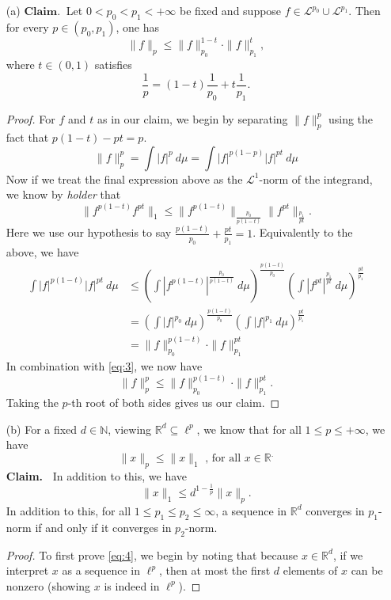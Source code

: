 \documentclass[12pt]{article}
\newcommand{\R}{\mathbb{R}}
\newcommand{\N}{\mathbb{N}}
\newcommand{\eq}[1]{\begin{equation*}#1\end{equation*}}
\newcommand{\al}[1]{\begin{align*}#1\end{align*}}
\newcommand{\qeq}[1]{\begin{equation}#1\end{equation}}
\begin{document}
\begin{itemize}
    \item [(a)] $\mathbf{Claim.}~$ Let $0 < p_0 < p_1 < +\infty$ be fixed and suppose $f \in \mathcal{L}^{p_0} \cup \mathcal{L}^{p_1}$. Then for every $p \in (p_0, p_1)$, one has
    \eq{\|f\|_p \leq \|f\|_{p_0}^{1-t} \cdot \|f\|_{p_1}^t,}
    where $t \in (0, 1)$ satisfies
    \eq{\frac{1}{p} = (1-t) \frac{1}{p_0} + t \frac{1}{p_1}.}
    
    \begin{proof}
        For $f$ and $t$ as in our claim, we begin by separating $\|f\|_p^p$ using the fact that $p(1-t) - pt = p$.
        \qeq{\|f\|_p^p = \int |f|^p ~d \mu = \int |f|^{p(1-p)} |f|^{pt} ~d\mu \label{eq:3}}
        Now if we treat the final expression above as the $\mathcal{L}^1$-norm of the integrand, we know by \textit{holder} that
        \eq{\|f^{p(1-t)}f^{pt}\|_1 \leq \|f^{p(1-t)}\|_\frac{p_0}{p(1-t)} \|f^{pt}\|_\frac{p_1}{pt}.}
        Here we use our hypothesis to say $\frac{p(1-t)}{p_0} + \frac{pt}{p_1} = 1$. Equivalently to the above, we have
        \al{\int |f|^{p(1-t)} |f|^{pt} ~d \mu &\leq \left( \int \left| f^{p(1-t)}\right|^\frac{p_0}{p(1-t)} ~d \mu\right)^\frac{p(1-t)}{p_0} \left( \int \left| f^{pt}\right|^\frac{p_1}{pt} ~d \mu \right)^\frac{pt}{p_1} \\
        &= \left( \int |f|^{p_0} ~d \mu\right)^\frac{p(1-t)}{p_0} \left( \int |f|^{p_1} ~d \mu\right)^\frac{pt}{p_1} \\
        &= \|f\|_{p_0}^{p(1-t)} \cdot \|f\|_{p_1}^{pt}}
        In combination with \eqref{eq:3}, we now have
        \eq{\|f\|_p^p \leq \|f\|_{p_0}^{p(1-t)} \cdot \|f\|_{p_1}^{pt}.}
        Taking the $p$-th root of both sides gives us our claim.
    \end{proof}

    \item [(b)] For a fixed $d \in \N$, viewing $\R^d \subseteq \ell^p$, we know that for all $1 \leq p \leq +\infty$, we have
    \eq{\|x\|_p \leq \|x\|_1 \text{ , for all } x \in \R^.}
    \textbf{Claim.~} In addition to this, we have
    \qeq{\|x\|_1 \leq d^{1 - \frac{1}{p}} \|x\|_p. \label{eq:4}}
    In addition to this, for all $1 \leq p_1 \leq p_2 \leq \infty$, a sequence in $\R^d$ converges in $p_1$-norm if and only if it converges in $p_2$-norm.

    \begin{proof}
        To first prove \eqref{eq:4}, we begin by noting that because $x \in \R^d$, if we interpret $x$ as a sequence in $\ell^p$, then at most the first $d$ elements of $x$ can be nonzero (showing $x$ is indeed in $\ell^p$).


\end{proof}
\end{itemize}
\end{document}

